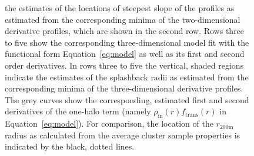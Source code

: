 \documentclass[iop, apjl, twocolappendix, numberedappendix]{emulateapj}
\begin{document}
\begin{figure}
{the estimates of the locations of steepest slope of the profiles as estimated from the corresponding minima of the two-dimensional
derivative profiles, which are shown in the second row.
Rows three to five show the corresponding three-dimensional model fit
with the functional form Equation~\ref{eq:model} as well as its first and
second order derivatives.
In rows three to five the vertical, shaded regions indicate the
estimates of the splashback radii as estimated from the corresponding minima
of the three-dimensional derivative profiles.
The grey curves show the corresponding, estimated first and second derivatives of the
one-halo term (namely $\rho_{\mathrm{in}}(r)f_{\mathrm{trans}}(r)$ in Equation~\ref{eq:model}).
For comparison, the location of the $r_{\mathrm{200m}}$ radius as calculated
from the average cluster sample properties is indicated by the black, dotted
lines.}
   \label{fig:all_graphs}
\end{figure}

\end{document}
